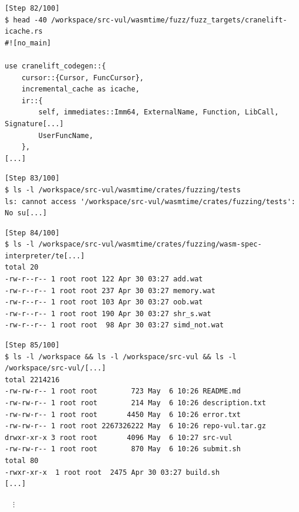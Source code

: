 \begin{tcolorbox}[enhanced,title={Example of \texttt{grep}/\texttt{ls}/\texttt{find} attempts}]
\begin{verbatim}
[Step 82/100]
$ head -40 /workspace/src-vul/wasmtime/fuzz/fuzz_targets/cranelift-icache.rs
#![no_main]

use cranelift_codegen::{
    cursor::{Cursor, FuncCursor},
    incremental_cache as icache,
    ir::{
        self, immediates::Imm64, ExternalName, Function, LibCall, Signature[...]
        UserFuncName,
    },
[...]
\end{verbatim}

\begin{verbatim}
[Step 83/100]
$ ls -l /workspace/src-vul/wasmtime/crates/fuzzing/tests
ls: cannot access '/workspace/src-vul/wasmtime/crates/fuzzing/tests': No su[...]
\end{verbatim}

\begin{verbatim}
[Step 84/100]
$ ls -l /workspace/src-vul/wasmtime/crates/fuzzing/wasm-spec-interpreter/te[...]
total 20
-rw-r--r-- 1 root root 122 Apr 30 03:27 add.wat
-rw-r--r-- 1 root root 237 Apr 30 03:27 memory.wat
-rw-r--r-- 1 root root 103 Apr 30 03:27 oob.wat
-rw-r--r-- 1 root root 190 Apr 30 03:27 shr_s.wat
-rw-r--r-- 1 root root  98 Apr 30 03:27 simd_not.wat
\end{verbatim}

\begin{verbatim}
[Step 85/100]
$ ls -l /workspace && ls -l /workspace/src-vul && ls -l /workspace/src-vul/[...]
total 2214216
-rw-rw-r-- 1 root root        723 May  6 10:26 README.md
-rw-rw-r-- 1 root root        214 May  6 10:26 description.txt
-rw-rw-r-- 1 root root       4450 May  6 10:26 error.txt
-rw-rw-r-- 1 root root 2267326222 May  6 10:26 repo-vul.tar.gz
drwxr-xr-x 3 root root       4096 May  6 10:27 src-vul
-rw-rw-r-- 1 root root        870 May  6 10:26 submit.sh
total 80
-rwxr-xr-x  1 root root  2475 Apr 30 03:27 build.sh
[...]
\end{verbatim}
\vspace{-\baselineskip}
$\quad\vdots$
\vspace{-.5\baselineskip}




\end{tcolorbox}
